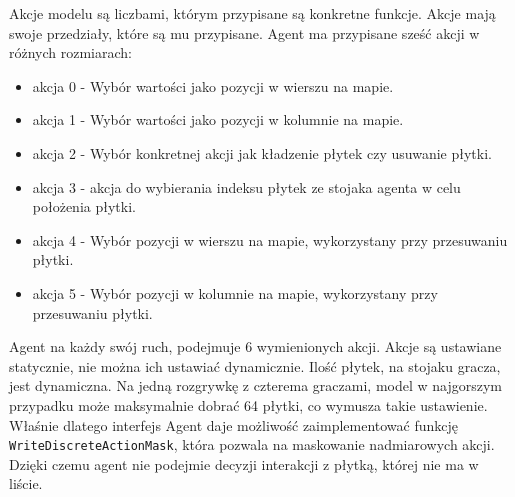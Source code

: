 \documentclass[a4paper,twoside,12pt]{book}
\begin{document}
		Akcje modelu są liczbami, którym przypisane są konkretne funkcje. Akcje mają swoje przedziały, które są mu przypisane. Agent ma przypisane sześć akcji w różnych rozmiarach:
		\begin{itemize}
			\item akcja 0 - Wybór wartości jako pozycji w wierszu na mapie. 
			\item akcja 1 - Wybór wartości jako pozycji w kolumnie na mapie.
			\item akcja 2 - Wybór konkretnej akcji jak kładzenie płytek czy usuwanie płytki.
			\item akcja 3 - akcja do wybierania indeksu płytek ze stojaka agenta w celu położenia płytki.
			\item akcja 4 - Wybór pozycji w wierszu na mapie, wykorzystany przy przesuwaniu płytki. 
			\item akcja 5 - Wybór pozycji w kolumnie na mapie, wykorzystany przy przesuwaniu płytki. 
		\end{itemize}
		Agent na każdy swój ruch, podejmuje 6 wymienionych akcji. Akcje są ustawiane statycznie, nie można ich ustawiać dynamicznie. Ilość płytek, na stojaku gracza, jest dynamiczna.
		Na jedną rozgrywkę z czterema graczami, model w najgorszym przypadku może maksymalnie dobrać 64 płytki, co wymusza takie ustawienie. Właśnie dlatego interfejs Agent daje możliwość zaimplementować funkcję \texttt{WriteDiscreteActionMask}, która pozwala na maskowanie nadmiarowych akcji. Dzięki czemu agent nie podejmie decyzji interakcji z płytką, której nie ma w liście.
	
\end{document}
